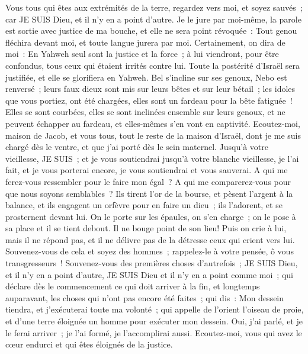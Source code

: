 \begin{multicols}{2}
Vous tous qui êtes aux extrémités de la terre, regardez vers moi, et soyez sauvés~; car JE SUIS Dieu, et il n'y en a point d'autre.
Je le jure par moi-même, la parole est sortie avec justice de ma bouche, et elle ne sera point révoquée~: Tout genou fléchira devant moi, et toute langue jurera par moi.
Certainement, on dira de moi~: En Yahweh seul sont la justice et la force~; à lui viendront, pour être confondus, tous ceux qui étaient irrités contre lui.
Toute la postérité d'Israël sera justifiée, et elle se glorifiera en Yahweh.
\VerseOne{}Bel s'incline sur ses genoux, Nebo est renversé~; leurs faux dieux sont mis sur leurs bêtes et sur leur bétail~; les idoles que vous portiez, ont été chargées, elles sont un fardeau pour la bête fatiguée~!
Elles se sont courbées, elles se sont inclinées ensemble sur leurs genoux, et ne peuvent échapper au fardeau, et elles-mêmes s'en vont en captivité.
Ecoutez-moi, maison de Jacob, et vous tous, tout le reste de la maison d'Israël, dont je me suis chargé dès le ventre, et que j'ai porté dès le sein maternel.
Jusqu'à votre vieillesse, JE SUIS~; et je vous soutiendrai jusqu'à votre blanche vieillesse, je l'ai fait, et je vous porterai encore, je vous soutiendrai et vous sauverai.
A qui me ferez-vous ressembler pour le faire mon égal~? A qui me comparerez-vous pour que nous soyons semblables~?
Ils tirent l'or de la bourse, et pèsent l'argent à la balance, et ils engagent un orfèvre pour en faire un dieu~; ils l'adorent, et se prosternent devant lui.
On le porte sur les épaules, on s'en charge~; on le pose à sa place et il se tient debout. Il ne bouge point de son lieu! Puis on crie à lui, mais il ne répond pas, et il ne délivre pas de la détresse ceux qui crient vers lui.
Souvenez-vous de cela et soyez des hommes~; rappelez-le à votre pensée, ô vous transgresseurs~!
Souvenez-vous des premières choses d'autrefois~; JE SUIS Dieu, et il n'y en a point d'autre, JE SUIS Dieu et il n'y en a point comme moi~;
qui déclare dès le commencement ce qui doit arriver à la fin, et longtemps auparavant, les choses qui n'ont pas encore été faites~; qui dis~: Mon dessein tiendra, et j'exécuterai toute ma volonté~;
qui appelle de l'orient l'oiseau de proie, et d'une terre éloignée un homme pour exécuter mon dessein. Oui, j'ai parlé, et je le ferai arriver~; je l'ai formé, je l'accomplirai aussi.
Ecoutez-moi, vous qui avez le cœur endurci et qui êtes éloignés de la justice.

\end{multicols}
